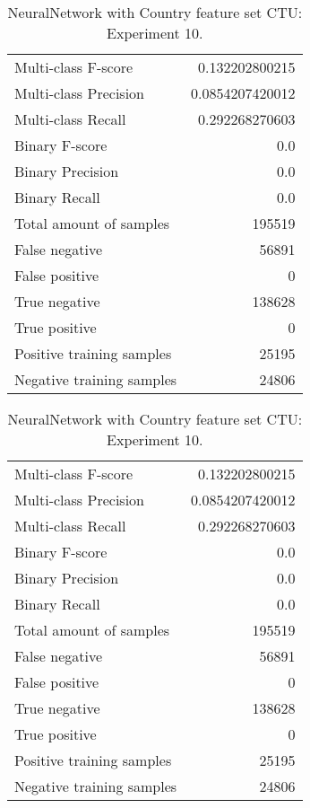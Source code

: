 \begin{table}[H]
\begin{minipage}{0.5\textwidth}
\caption{NeuralNetwork with Country feature set CTU: \\Experiment 9.}
\centering
\begin{tabular}{l r}
\toprule
Multi-class F-score & 0.132202800215 \\
Multi-class Precision & 0.0854207420012 \\
Multi-class Recall & 0.292268270603 \\
\midrule
Binary F-score & 0.0 \\
Binary Precision & 0.0 \\
Binary Recall & 0.0 \\
\midrule
Total amount of samples & 195519 \\
False negative & 56891 \\
False positive & 0 \\
True negative & 138628 \\
True positive & 0 \\
\midrule
Positive training samples & 25195 \\
Negative training samples & 24806 \\
\bottomrule
\end{tabular}
\end{minipage}
\hfillx
\begin{minipage}{0.5\textwidth}
\caption{NeuralNetwork with Country feature set CTU: \\Experiment 10.}
\centering
\begin{tabular}{l r}
\toprule
Multi-class F-score & 0.132202800215 \\
Multi-class Precision & 0.0854207420012 \\
Multi-class Recall & 0.292268270603 \\
\midrule
Binary F-score & 0.0 \\
Binary Precision & 0.0 \\
Binary Recall & 0.0 \\
\midrule
Total amount of samples & 195519 \\
False negative & 56891 \\
False positive & 0 \\
True negative & 138628 \\
True positive & 0 \\
\midrule
Positive training samples & 25195 \\
Negative training samples & 24806 \\
\bottomrule
\end{tabular}
\end{minipage}
\end{table}
